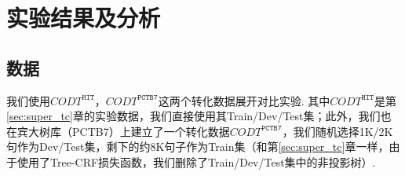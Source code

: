 


\section{实验结果及分析}
\subsection{数据}
我们使用$CODT^{\texttt{HIT}}$，$CODT^{\texttt{PCTB7}}$这两个转化数据展开对比实验. 其中$CODT^{\texttt{HIT}}$是第\ref{sec:super_tc}章的实验数据，我们直接使用其Train/Dev/Test集；此外，我们也在宾大树库（PCTB7）上建立了一个转化数据$CODT^{\texttt{PCTB7}}$，我们随机选择1K/2K句作为Dev/Test集，剩下的约8K句子作为Train集（和第\ref{sec:super_tc}章一样，由于使用了Tree-CRF损失函数，我们删除了Train/Dev/Test集中的非投影树）.

